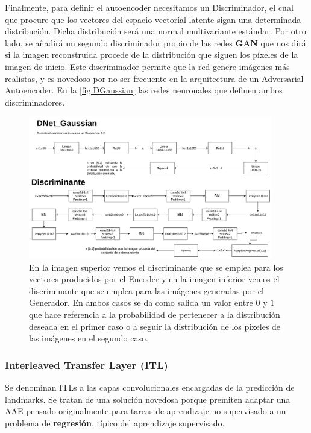             \noindent Finalmente, para definir el autoencoder necesitamos un Discriminador, el cual que procure que los vectores del espacio vectorial latente sigan una determinada distribución. Dicha distribución será una normal multivariante estándar. Por otro lado, se añadirá un segundo discriminador propio de las redes \textbf{GAN} que nos dirá si la imagen reconstruida procede de la distribución que siguen los píxeles de la imagen de inicio. Este discriminador permite que la red genere imágenes más realistas, y es novedoso por no ser frecuente en la arquitectura de un Adversarial Autoencoder. En la \autoref{fig:DGaussian} las redes neuronales que definen ambos discriminadores.

            \begin{figure}[!h]
                \centering
                \includegraphics[width=0.95\textwidth]{img/DGaussian.png}
                \caption{En la imagen superior vemos el discriminante que se emplea para los vectores producidos por el Encoder y en la imagen inferior vemos el discriminante que se emplea para las imágenes generadas por el Generador. En ambos casos se da como salida un valor entre $0$ y $1$ que hace referencia a la probabilidad de pertenecer a la distribución deseada en el primer caso o a seguir la distribución de los píxeles de las imágenes en el segundo caso.}
                \label{fig:DGaussian}
            \end{figure}

            \subsubsection{Interleaved Transfer Layer (ITL)}
                \noindent Se denominan ITLs a las capas convolucionales encargadas de la predicción de landmarks. Se tratan de una solución novedosa porque premiten adaptar una AAE pensado originalmente para tareas de aprendizaje no supervisado a un problema de \textbf{regresión}, típico del aprendizaje supervisado.

